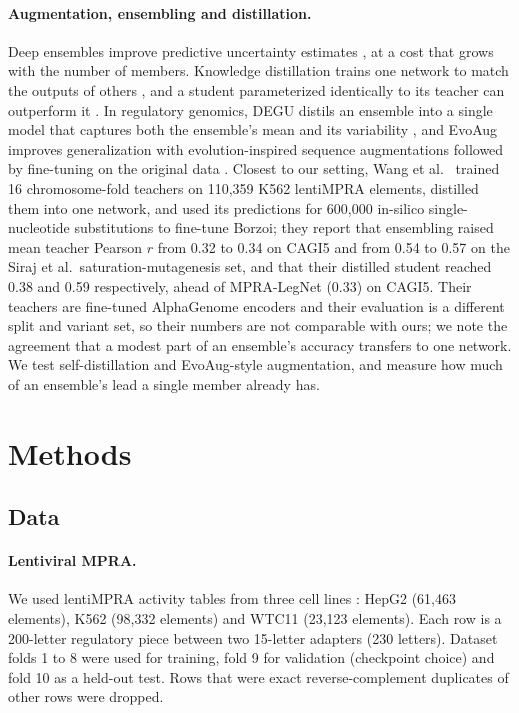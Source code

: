 \documentclass[11pt]{article}
\begin{document}
\paragraph{Augmentation, ensembling and distillation.} Deep ensembles improve predictive uncertainty estimates \cite{lakshminarayanan2016simple}, at a cost that grows with the number of members. Knowledge distillation trains one network to match the outputs of others \cite{hinton2015distilling}, and a student parameterized identically to its teacher can outperform it \cite{furlanello2018born}. In regulatory genomics, DEGU distils an ensemble into a single model that captures both the ensemble's mean and its variability \cite{zhou2026uncertaintyaware}, and EvoAug improves generalization with evolution-inspired sequence augmentations followed by fine-tuning on the original data \cite{lee2023evoaug}. Closest to our setting, Wang et al.\ \cite{wang2026synthetic} trained 16 chromosome-fold teachers on 110,359 K562 lentiMPRA elements, distilled them into one network, and used its predictions for 600,000 in-silico single-nucleotide substitutions to fine-tune Borzoi; they report that ensembling raised mean teacher Pearson $r$ from 0.32 to 0.34 on CAGI5 and from 0.54 to 0.57 on the Siraj et al.\ saturation-mutagenesis set, and that their distilled student reached 0.38 and 0.59 respectively, ahead of MPRA-LegNet (0.33) on CAGI5. Their teachers are fine-tuned AlphaGenome encoders and their evaluation is a different split and variant set, so their numbers are not comparable with ours; we note the agreement that a modest part of an ensemble's accuracy transfers to one network. We test self-distillation and EvoAug-style augmentation, and measure how much of an ensemble's lead a single member already has.

\section{Methods}
\label{sec:methods}

\subsection{Data}
\label{sec:data}

\paragraph{Lentiviral MPRA.} We used lentiMPRA activity tables from three cell lines \cite{agarwal2025massively}: HepG2 (61,463 elements), K562 (98,332 elements) and WTC11 (23,123 elements). Each row is a 200-letter regulatory piece between two 15-letter adapters (230 letters). Dataset folds 1 to 8 were used for training, fold 9 for validation (checkpoint choice) and fold 10 as a held-out test. Rows that were exact reverse-complement duplicates of other rows were dropped.
\end{document}
